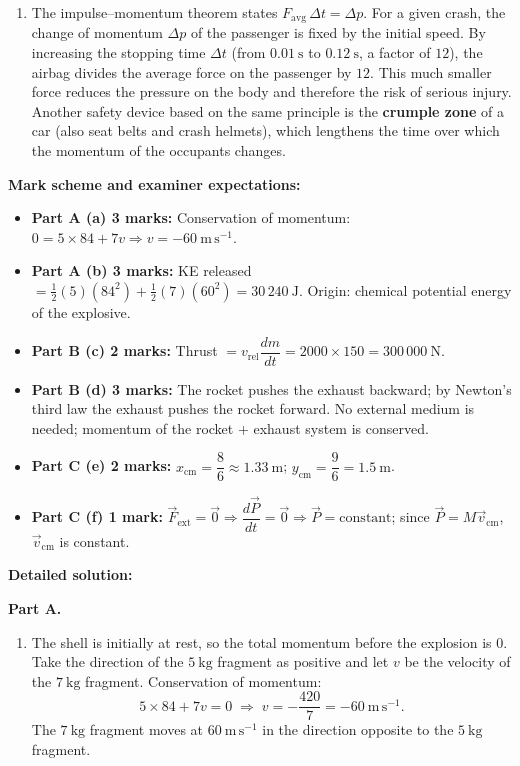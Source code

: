 \documentclass[11pt]{article}
\begin{document}
\begin{corrige}
\begin{enumerate}
\item[(d)] The impulse–momentum theorem states $F_{\mathrm{avg}}\,\Delta t = \Delta p$. For a given crash, the change of momentum $\Delta p$ of the passenger is fixed by the initial speed. By increasing the stopping time $\Delta t$ (from $0.01\ \mathrm{s}$ to $0.12\ \mathrm{s}$, a factor of $12$), the airbag divides the average force on the passenger by $12$. This much smaller force reduces the pressure on the body and therefore the risk of serious injury. Another safety device based on the same principle is the \textbf{crumple zone} of a car (also seat belts and crash helmets), which lengthens the time over which the momentum of the occupants changes.
\end{enumerate}
\end{corrige}

\begin{corrige}
\textbf{Mark scheme and examiner expectations:}
\begin{itemize}
\item \textbf{Part A (a) 3 marks:} Conservation of momentum: $0 = 5 \times 84 + 7v \Rightarrow v = -60\ \mathrm{m\,s^{-1}}$.
\item \textbf{Part A (b) 3 marks:} KE released $= \frac{1}{2}(5)(84^2) + \frac{1}{2}(7)(60^2) = 30\,240\ \mathrm{J}$. Origin: chemical potential energy of the explosive.
\item \textbf{Part B (c) 2 marks:} Thrust $= v_{\mathrm{rel}} \dfrac{dm}{dt} = 2000 \times 150 = 300\,000\ \mathrm{N}$.
\item \textbf{Part B (d) 3 marks:} The rocket pushes the exhaust backward; by Newton's third law the exhaust pushes the rocket forward. No external medium is needed; momentum of the rocket + exhaust system is conserved.
\item \textbf{Part C (e) 2 marks:} $x_{\mathrm{cm}} = \dfrac{8}{6} \approx 1.33\ \mathrm{m}$; $y_{\mathrm{cm}} = \dfrac{9}{6} = 1.5\ \mathrm{m}$.
\item \textbf{Part C (f) 1 mark:} $\vec{F}_{\mathrm{ext}}=\vec{0} \Rightarrow \dfrac{d\vec{P}}{dt}=\vec{0} \Rightarrow \vec{P}=\text{constant}$; since $\vec{P}=M\vec{v}_{\mathrm{cm}}$, $\vec{v}_{\mathrm{cm}}$ is constant.
\end{itemize}

\textbf{Detailed solution:}

\textbf{Part A.}
\begin{enumerate}
\item The shell is initially at rest, so the total momentum before the explosion is $0$. Take the direction of the $5\ \mathrm{kg}$ fragment as positive and let $v$ be the velocity of the $7\ \mathrm{kg}$ fragment. Conservation of momentum:
\[ 5 \times 84 + 7v = 0 \;\Rightarrow\; v = -\frac{420}{7} = -60\ \mathrm{m\,s^{-1}}. \]
The $7\ \mathrm{kg}$ fragment moves at $60\ \mathrm{m\,s^{-1}}$ in the direction opposite to the $5\ \mathrm{kg}$ fragment.


\end{enumerate}
\end{corrige}
\end{document}
